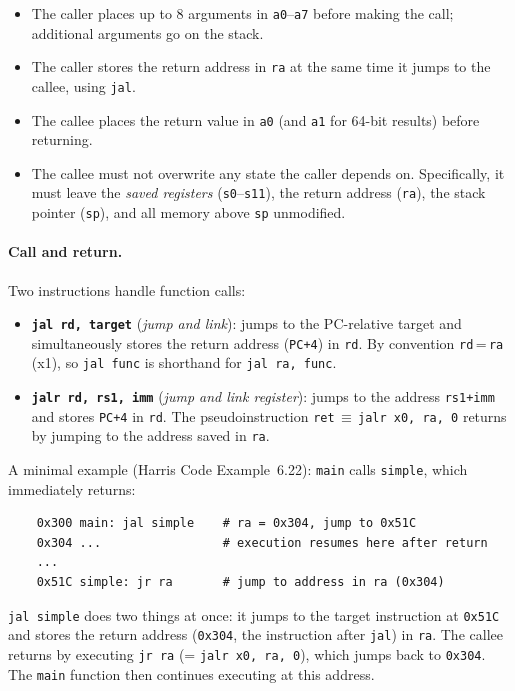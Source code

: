 \documentclass[9pt, a4paper]{extarticle}
\begin{document}
\begin{itemize}
    \item The caller places up to 8 arguments in \texttt{a0}--\texttt{a7} before making the call; additional arguments go on the stack.
    \item The caller stores the return address in \texttt{ra} at the same time it jumps to the callee, using \texttt{jal}.
    \item The callee places the return value in \texttt{a0} (and \texttt{a1} for 64-bit results) before returning.
    \item The callee must not overwrite any state the caller depends on. Specifically, it must leave the \emph{saved registers} (\texttt{s0}--\texttt{s11}), the return address (\texttt{ra}), the stack pointer (\texttt{sp}), and all memory above \texttt{sp} unmodified.
\end{itemize}

\paragraph{Call and return.} Two instructions handle function calls:

\begin{itemize}
    \item \textbf{\texttt{jal rd, target}} (\emph{jump and link}): jumps to the PC-relative target and simultaneously stores the return address (\texttt{PC+4}) in \texttt{rd}. By convention \texttt{rd}\,=\,\texttt{ra} (x1), so \texttt{jal func} is shorthand for \texttt{jal ra, func}.
    \item \textbf{\texttt{jalr rd, rs1, imm}} (\emph{jump and link register}): jumps to the address \texttt{rs1+imm} and stores \texttt{PC+4} in \texttt{rd}. The pseudoinstruction \texttt{ret}\,$\equiv$\,\texttt{jalr x0, ra, 0} returns by jumping to the address saved in \texttt{ra}.
\end{itemize}

A minimal example (Harris Code Example~6.22): \texttt{main} calls \texttt{simple}, which immediately returns:

\begin{verbatim}
    0x300 main: jal simple    # ra = 0x304, jump to 0x51C
    0x304 ...                 # execution resumes here after return
    ...
    0x51C simple: jr ra       # jump to address in ra (0x304)
\end{verbatim}

\texttt{jal simple} does two things at once: it jumps to the target instruction at \texttt{0x51C} and stores the return address (\texttt{0x304}, the instruction after \texttt{jal}) in \texttt{ra}. The callee returns by executing \texttt{jr ra} (= \texttt{jalr x0, ra, 0}), which jumps back to \texttt{0x304}. The \texttt{main} function then continues executing at this address.
\end{document}
